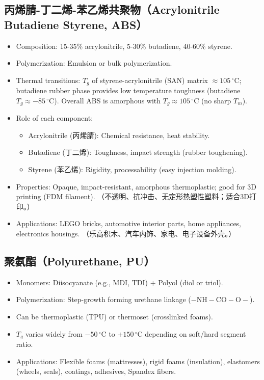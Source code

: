 \documentclass[12pt,a4paper]{ctexart}
\begin{document}
\subsection{丙烯腈-丁二烯-苯乙烯共聚物（Acrylonitrile Butadiene Styrene, ABS）}
\begin{itemize}[leftmargin=*]
    \item Composition: 15-35\% acrylonitrile, 5-30\% butadiene, 40-60\% styrene.
    \item Polymerization: Emulsion or bulk polymerization.
    \item Thermal transitions: $T_g$ of styrene-acrylonitrile (SAN) matrix $\approx 105\,^\circ$C; butadiene rubber phase provides low temperature toughness (butadiene $T_g \approx -85\,^\circ$C). Overall ABS is amorphous with $T_g \approx 105\,^\circ$C (no sharp $T_m$).
    \item Role of each component:
        \begin{itemize}
            \item Acrylonitrile (丙烯腈): Chemical resistance, heat stability.
            \item Butadiene (丁二烯): Toughness, impact strength (rubber toughening).
            \item Styrene (苯乙烯): Rigidity, processability (easy injection molding).
        \end{itemize}
    \item Properties: Opaque, impact-resistant, amorphous thermoplastic; good for 3D printing (FDM filament). （不透明、抗冲击、无定形热塑性塑料；适合3D打印。）
    \item Applications: LEGO bricks, automotive interior parts, home appliances, electronics housings. （乐高积木、汽车内饰、家电、电子设备外壳。）
\end{itemize}

\subsection{聚氨酯（Polyurethane, PU）}
\begin{itemize}[leftmargin=*]
    \item Monomers: Diisocyanate (e.g., MDI, TDI) + Polyol (diol or triol).
    \item Polymerization: Step-growth forming urethane linkage ($-\mathrm{NH-CO-O}-$).
    \item Can be thermoplastic (TPU) or thermoset (crosslinked foams).
    \item $T_g$ varies widely from $-50\,^\circ$C to $+150\,^\circ$C depending on soft/hard segment ratio.
    \item Applications: Flexible foams (mattresses), rigid foams (insulation), elastomers (wheels, seals), coatings, adhesives, Spandex fibers.
\end{itemize}
\end{document}
